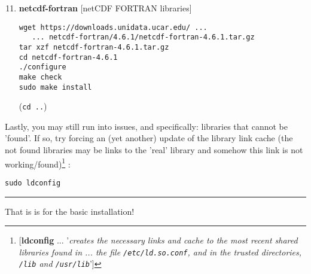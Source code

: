 \documentclass[10pt,twoside]{article}
\begin{document}
\begin{enumerate}[noitemsep]
\setcounter{enumi}{10}

\item \textbf{netcdf-fortran} [netCDF FORTRAN libraries]

\vspace{-2pt}
\begin{verbatim}
wget https://downloads.unidata.ucar.edu/ ...
   ... netcdf-fortran/4.6.1/netcdf-fortran-4.6.1.tar.gz
tar xzf netcdf-fortran-4.6.1.tar.gz
cd netcdf-fortran-4.6.1
./configure
make check
sudo make install
\end{verbatim}
\vspace{-2pt}
(\texttt{cd ..})

\end{enumerate}

\noindent Lastly, you may still run into issues, and specifically: libraries that cannot be 'found'. If so, try forcing an (yet another) update of the library link cache (the not found libraries may be links to the 'real' library and somehow this link is not working/found)\footnote{[\textbf{ldconfig} ... '\textit{creates the necessary links and cache to the most recent shared libraries found in ... the file \texttt{/etc/ld.so.conf}, and in the trusted directories, \texttt{/lib} and \texttt{/usr/lib}}']} :
\vspace{-2pt}
\begin{verbatim}
sudo ldconfig
\end{verbatim}

\vspace{1mm}
\noindent\rule{4cm}{0.1mm}

\noindent That is is for the basic installation!

\end{document}
